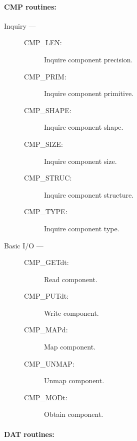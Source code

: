 \paragraph{CMP routines:}

\begin{description}

\item [Inquiry ---]

\begin{description}
\item [CMP\_LEN:]  Inquire component precision.
\item [CMP\_PRIM:]  Inquire component primitive.
\item [CMP\_SHAPE:]  Inquire component shape.
\item [CMP\_SIZE:]  Inquire component size.
\item [CMP\_STRUC:]  Inquire component structure.
\item [CMP\_TYPE:]  Inquire component type.
\end{description}

\item [Basic I/O ---]

\begin{description}
\item [CMP\_GETdt:]  Read component.
\item [CMP\_PUTdt:]  Write component.
\item [CMP\_MAPd:]  Map component.
\item [CMP\_UNMAP:]  Unmap component.
\item [CMP\_MODt:]  Obtain component.
\end{description}

\end{description}

\newpage

\paragraph{DAT routines:}

